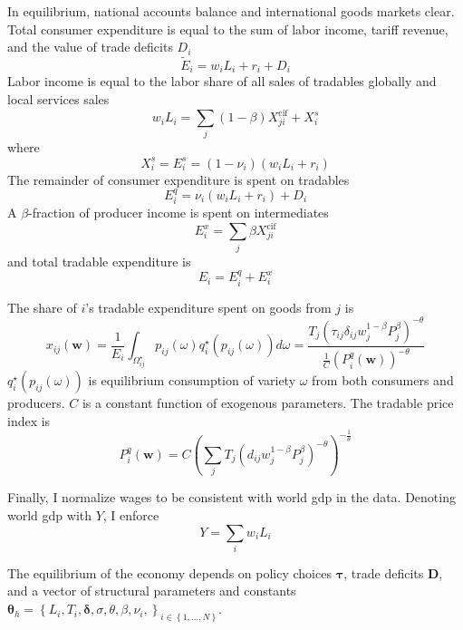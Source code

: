 \documentclass{puthesis}
\begin{document}
In equilibrium, national accounts balance and international goods
markets clear. Total consumer expenditure is equal to the sum of labor
income, tariff revenue, and the value of trade deficits \(D_i\) \[
\tilde{E}_i = w_i L_i + r_i + D_i
\] Labor income is equal to the labor share of all sales of tradables
globally and local services sales \begin{equation} \label{eq:income}
w_i L_i = \sum_j (1 - \beta) X_{ji}^{\text{cif}} + X_i^s
\end{equation} where \[
X_i^s = E_i^s = (1 - \nu_i) (w_i L_i + r_i)
\] The remainder of consumer expenditure is spent on tradables \[
E_i^q = \nu_i (w_i L_i + r_i) + D_i
\] A \(\beta\)-fraction of producer income is spent on intermediates \[
E_i^x = \sum_j \beta X_{ji}^{\text{cif}}
\] and total tradable expenditure is \begin{equation} \label{eq:tExp}
E_i = E_i^q + E_i^x
\end{equation}

The share of \(i\)'s tradable expenditure spent on goods from \(j\) is
\begin{equation} \label{eq:shares}
x_{ij}(\bm{w}) = \frac{1}{E_i} \int_{\Omega_{ij}^\star} p_{ij}(\omega) q_i^\star \left( p_{ij} (\omega) \right) d \omega = \frac{ T_j \left( \tau_{ij} \delta_{ij} w_j^{1 - \beta} P_j^{\beta} \right)^{-\theta} }{ \frac{1}{C} \left( P_i^q(\bm{w}) \right)^{-\theta}}
\end{equation} \(q_i^\star \left( p_{ij} (\omega) \right)\) is
equilibrium consumption of variety \(\omega\) from both consumers and
producers. \(C\) is a constant function of exogenous parameters. The
tradable price index is \begin{equation} \label{eq:Pindex}
P_i^q(\bm{w}) = C \left( \sum_j T_j \left( d_{ij} w_j^{1 - \beta} P_j^{\beta} \right)^{- \theta} \right)^{-\frac{1}{\theta}}
\end{equation}

Finally, I normalize wages to be consistent with world gdp in the data.
Denoting world gdp with \(Y\), I enforce
\begin{equation} \label{eq:normalization}
Y = \sum_i w_i L_i
\end{equation}

The equilibrium of the economy depends on policy choices \(\bm{\tau}\),
trade deficits \(\bm{D}\), and a vector of structural parameters and
constants
\(\bm{\theta}_h = \left\{ L_i, T_i, \bm{\delta}, \sigma, \theta, \beta, \nu_i, \right\}_{i \in \left\{ 1, ..., N \right\}}\).
\end{document}
